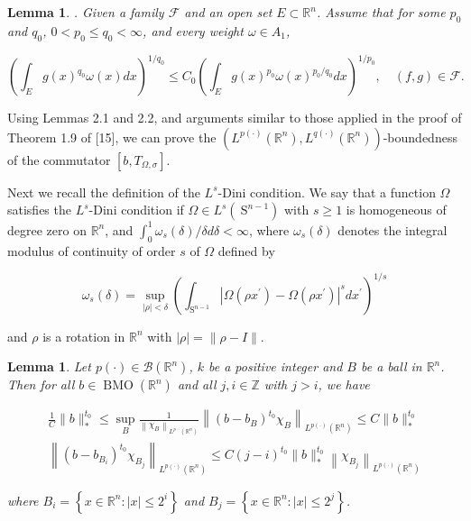 \documentclass[oneside,reqno]{amsart}
\newtheorem{lem}[theorem]{Lemma}
\numberwithin{equation}{section}
\theoremstyle{definition}
\begin{document}
\begin{lem} \cite{uribe}. Given a family $\mathcal{F}$ and an open set $E \subset \mathbb{R}^{n}$. Assume that for some $p_{0}$ and $q_{0}$, $0<p_{0} \leq q_{0}<\infty$, and every weight $\omega \in A_{1}$,

$$
\left(\int_{E} g(x)^{q_{0}} \omega(x) d x\right)^{1 / q_{0}} \leq C_{0}\left(\int_{E} g(x)^{p_{0}} \omega(x)^{p_{0} / q_{0}} d x\right)^{1 / p_{0}}, \quad(f, g) \in \mathcal{F}.
$$
\end{lem}

Using Lemmas 2.1 and 2.2, and arguments similar to those applied in the proof of Theorem 1.9 of [15], we can prove the $\left(L^{p(\cdot)}\left(\mathbb{R}^{n}\right), L^{q(\cdot)}\left(\mathbb{R}^{n}\right)\right)$-boundedness of the commutator $\left[b, T_{\Omega, \sigma}\right]$.

Next we  recall the definition of the $L^{s}$-Dini condition. We say that a function $\Omega$ satisfies the $L^{s}$-Dini condition if $\Omega \in L^{s}\left(\mathrm{~S}^{n-1}\right)$ with $s \geq 1$ is homogeneous of degree zero on $\mathbb{R}^{n}$, and $\int_{0}^{1} \omega_{s}(\delta) / \delta d \delta<\infty$, where $\omega_{s}(\delta)$ denotes the integral modulus of continuity of order $s$ of $\Omega$ defined by

$$
\omega_{s}(\delta)=\sup _{|\rho|<\delta}\left(\int_{\mathrm{S}^{n-1}}\left|\Omega\left(\rho x^{\prime}\right)-\Omega\left(\rho x^{\prime}\right)\right|^{s} d x^{\prime}\right)^{1 / s}
$$

and $\rho$ is a rotation in $\mathbb{R}^{n}$ with $|\rho|=\|\rho-I\|$.


\begin{lem}\cite{tan} Let $p(\cdot) \in \mathcal{B}\left(\mathbb{R}^{n}\right)$, $k$ be a positive integer and $B$ be a ball in $\mathbb{R}^{n}$. Then for all $b \in \operatorname{BMO}\left(\mathbb{R}^{n}\right)$ and all $j, i \in \mathbb{Z}$ with $j>i$, we have

$$
\begin{gathered}
\frac{1}{C}\|b\|_{*}^{t_0} \leq \sup _{B} \frac{1}{\left\|\chi_{B}\right\|_{L^{p \cdot \cdot}\left(\mathbb{R}^{n}\right)}}\left\|\left(b-b_{B}\right)^{t_0} \chi_{B}\right\|_{L^{p(\cdot)}\left(\mathbb{R}^{n}\right)} \leq C\|b\|_{*}^{t_0} \\
\left\|\left(b-b_{B_{i}}\right)^{t_0} \chi_{B_{j}}\right\|_{L^{p(\cdot)}\left(\mathbb{R}^{n}\right)} \leq C(j-i)^{t_0}\|b\|_{*}^{t_0}\left\|\chi_{B_{j}}\right\|_{L^{p(\cdot)}\left(\mathbb{R}^{n}\right)}
\end{gathered}
$$

where $B_{i}=\left\{x \in \mathbb{R}^{n}:|x| \leq 2^{i}\right\}$ and $B_{j}=\left\{x \in \mathbb{R}^{n}:|x| \leq 2^{j}\right\}$.
\end{lem}
\end{document}
